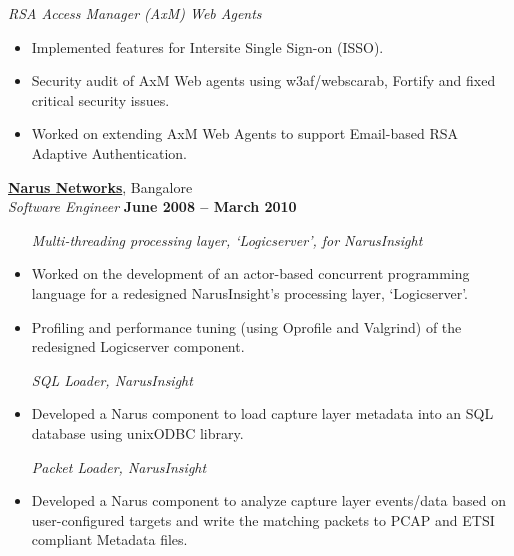 \documentclass[9pt]{article}
\newcommand{\blankline}{\quad\pagebreak[2]}
\begin{document}
	\textsl{RSA Access Manager (AxM) Web Agents}
	\begin{itemize}
		\item Implemented features for Intersite Single Sign-on (ISSO).%
		\item Security audit of AxM Web agents using w3af/webscarab, Fortify and fixed critical security issues. %
		\item Worked on extending AxM Web Agents to support Email-based RSA Adaptive Authentication. \vspace{0mm}\\\vspace{1mm}%
	\end{itemize}


    \href{http://www.narus.com/}{\textbf{Narus Networks}}, Bangalore \vspace{2mm}\\\vspace{1mm}%
    \textsl{Software Engineer} \hfill \textbf{June 2008 -- March 2010}%
	
	\blankline

	\begin{itemize}
	  \item [\textsl{Multi-threading processing layer, `Logicserver', for NarusInsight}]
		\item Worked on the development of an actor-based concurrent programming language for a redesigned NarusInsight's processing layer, `Logicserver'. %
		\item Profiling and performance tuning (using Oprofile and Valgrind) of the redesigned Logicserver component. %
	\end{itemize}

	\blankline
	
	\begin{itemize}
          \item [\textsl{SQL Loader, NarusInsight}]
		\item Developed a Narus component to load capture layer metadata into an SQL database using unixODBC library. %
	\end{itemize}

	\blankline

	\begin{itemize}
	  \item [\textsl{Packet Loader, NarusInsight}]
		\item Developed a Narus component to analyze capture layer events/data based on user-configured targets and write the matching packets to PCAP and ETSI compliant Metadata files. \vspace{0mm}\\\vspace{1mm}%
	\end{itemize} 
 
\end{document}
